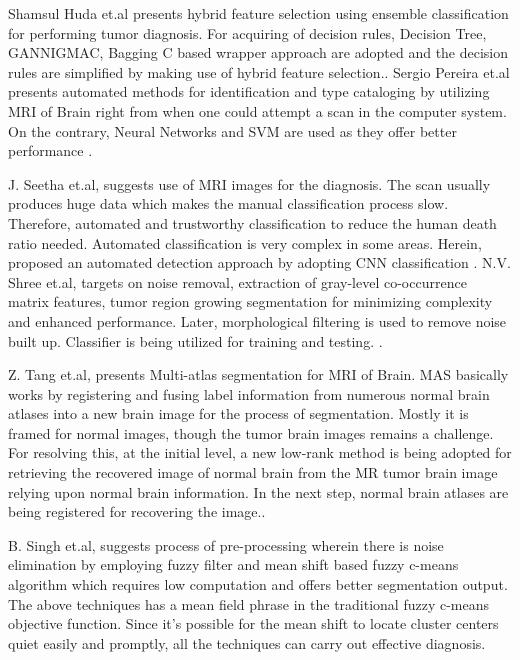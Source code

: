 \documentclass[a4paper, 12pt]{report}
\begin{document}
\begin{spacing}{1.5}
\par  Shamsul Huda et.al presents hybrid feature selection using ensemble classification for performing tumor diagnosis. For acquiring of decision rules, Decision Tree, GANNIGMAC, Bagging C based wrapper approach are adopted and the decision rules are simplified by making use of hybrid feature selection.\cite{smsl}. Sergio Pereira et.al presents automated methods for identification and type cataloging by utilizing MRI of Brain right from when one could attempt a scan in the computer system. On the contrary, Neural Networks and SVM are used as they offer better performance \cite{sergio}.\\

\par J. Seetha et.al, suggests use of MRI images for the diagnosis. The scan usually produces huge data which makes the manual classification process slow. Therefore, automated and trustworthy classification to reduce the human death ratio needed. Automated classification is very complex in some areas. Herein, proposed an automated detection approach by adopting CNN classification \cite{jsit}. N.V. Shree et.al, targets on noise removal, extraction of gray-level co-occurrence matrix features, tumor region growing segmentation for minimizing complexity and enhanced performance. Later, morphological filtering is used to remove noise built up. Classifier is being utilized for training and testing. \cite{nvs}.\\

\par Z. Tang et.al, presents Multi-atlas segmentation for MRI of Brain. MAS basically works by registering and fusing label information from numerous normal brain atlases into a new brain image for the process of segmentation. Mostly it is framed for normal images, though the tumor brain images remains a challenge. For resolving this, at the initial level, a new low-rank method is being adopted for retrieving the recovered image of normal brain from the MR tumor brain image relying upon normal brain information. In the next step, normal brain atlases are being registered for recovering the image.\cite{zhen}.

\par B. Singh et.al, suggests process of pre-processing wherein there is noise elimination by employing fuzzy filter and mean shift based fuzzy c-means algorithm which requires low computation and offers better segmentation output. The above techniques has a mean field phrase in the traditional fuzzy c-means objective function. Since it’s possible for the mean shift to locate cluster centers quiet
easily and promptly, all the techniques can carry out effective diagnosis\cite{balj}.


\end{spacing}
\end{document}
